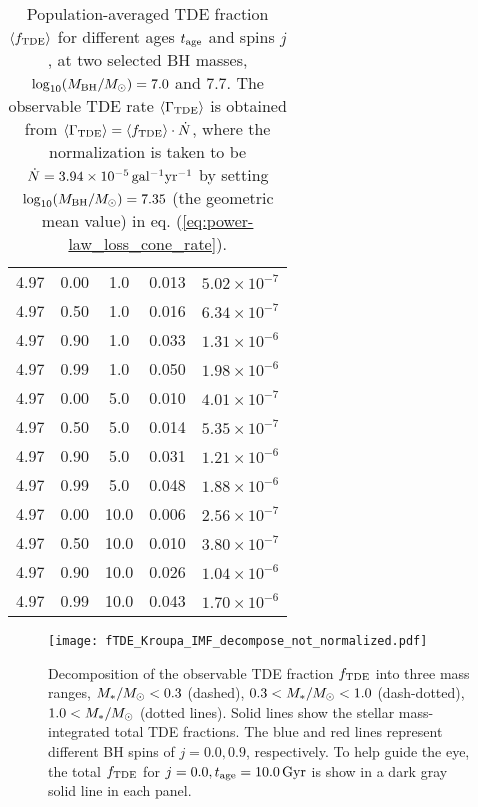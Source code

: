 \documentclass[useAMS,usenatbib]{mn2e}
\def\msun{M_{\rm \odot}}
\def\mstar{M_*}
\def\mBH{M_{\rm BH}}
\def\GammaTDE{\Gamma_{\rm TDE}}
\def\fTDE{f_{\rm TDE}}
\def\tage{t_{\rm age}}
\def\Gyr{{\rm Gyr}}
\newcommand{\lara}[1]{\left\langle{#1}\right\rangle}
\begin{document}
\begin{table}
\begin{tabular}{ccccc}
            4.97 & 0.00 &          1.0 & 0.013 & $5.02\times10^{-7}$ \\
            4.97 & 0.50 &          1.0 & 0.016 & $6.34\times10^{-7}$ \\
            4.97 & 0.90 &          1.0 & 0.033 & $1.31\times10^{-6}$ \\
            4.97 & 0.99 &          1.0 & 0.050 & $1.98\times10^{-6}$ \\
            4.97 & 0.00 &          5.0 & 0.010 & $4.01\times10^{-7}$ \\
            4.97 & 0.50 &          5.0 & 0.014 & $5.35\times10^{-7}$ \\
            4.97 & 0.90 &          5.0 & 0.031 & $1.21\times10^{-6}$ \\
            4.97 & 0.99 &          5.0 & 0.048 & $1.88\times10^{-6}$ \\
            4.97 & 0.00 &         10.0 & 0.006 & $2.56\times10^{-7}$ \\
            4.97 & 0.50 &         10.0 & 0.010 & $3.80\times10^{-7}$ \\
            4.97 & 0.90 &         10.0 & 0.026 & $1.04\times10^{-6}$ \\
            4.97 & 0.99 &         10.0 & 0.043 & $1.70\times10^{-6}$ \\
    \hline
    \end{tabular}
    \caption{
    Population-averaged TDE fraction $\lara{\fTDE}$ for different ages $\tage$ and spins $j$, at two selected BH masses, $\log_{10}(\mBH/\msun)=7.0$ and $7.7$.
    The observable TDE rate $\lara{\GammaTDE}$ is obtained from $\lara{\GammaTDE}=\lara{\fTDE}\cdot\dot{N}$, where the normalization is taken to be $\dot{N}=3.94\times10^{-5}\,\rm gal^{-1}yr^{-1}$ by setting $\log_{10}(\mBH/\msun)=7.35$ (the geometric mean value) in eq. (\ref{eq:power-law_loss_cone_rate}).
    }
    \label{tab:fTDE}
\end{table}

\begin{figure}
    \centering
    \texttt{[image: fTDE\_Kroupa\_IMF\_decompose\_not\_normalized.pdf]}
    \caption{
    Decomposition of the observable TDE fraction $\fTDE$ into three mass ranges, $\mstar/\msun<0.3$ (dashed), $0.3<\mstar/\msun<1.0$ (dash-dotted), $1.0<\mstar/\msun$ (dotted lines). Solid lines show the stellar mass-integrated total TDE fractions.
    The blue and red lines represent different BH spins of $j=0.0,0.9$, respectively.
    To help guide the eye, the total $\fTDE$ for $j=0.0, \tage=10.0\,\Gyr$ is show in a dark gray solid line in each panel.
    }
    \label{fig:TDE_rate_decomposed_no_normalization}
\end{figure}

\label{lastpage}
\end{document}
